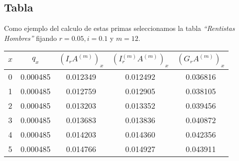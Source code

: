 \subsection{Tabla}

Como ejemplo del calculo de estas primas seleccionamos la tabla \textsl{``Rentistas Hombres''} fijando $r = 0.05, i=0.1$ y $m=12$.

\begin{center}
\begin{tabular}{|c|c|c|c|c|}
    \hline
    $x$ & $q_x$ & $(I_rA^{(m)})_x$ & $(I^{(m)}_rA^{(m)})_x$ & $(G_rA^{(m)})_x$ \\
    \hline
    0     & 0.000485   & 0.012349     & 0.012492     & 0.036816 \\
    1     & 0.000485   & 0.012759     & 0.012905     & 0.038105 \\ 
    2     & 0.000485   & 0.013203     & 0.013352     & 0.039456 \\ 
    3     & 0.000485   & 0.013683     & 0.013836     & 0.040872 \\ 
    4     & 0.000485   & 0.014203     & 0.014360     & 0.042356 \\ 
    5     & 0.000485   & 0.014766     & 0.014927     & 0.043911 \\
\end{tabular}
\end{center}


